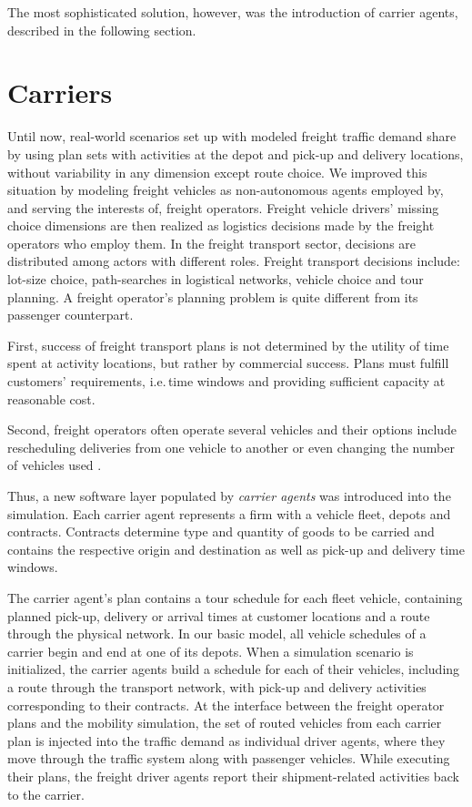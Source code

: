 The most sophisticated solution, however, was the introduction of carrier agents, described in the following section. 

\section{Carriers}
\label{sec:carriers}
Until now, real-world scenarios set up with  modeled freight traffic demand share by using plan sets with activities at the depot and pick-up and delivery locations, without variability in any dimension except route choice. We improved this situation by modeling freight vehicles as non-autonomous agents employed by, and serving the interests of, freight operators. Freight vehicle drivers' missing choice dimensions are then realized as logistics decisions made by the freight operators who employ them. In the freight transport sector, decisions are distributed among actors with different roles. Freight transport decisions include: lot-size choice, path-searches in logistical networks, vehicle choice and tour planning. A freight operator's planning problem is quite different from its passenger counterpart.

First, success of freight transport plans is not determined by the utility of time
spent at activity locations, but rather by commercial success. Plans must fulfill
customers' requirements, i.e.\,time windows and providing sufficient capacity at
reasonable cost.

Second, freight operators often operate several vehicles and their
options include rescheduling deliveries from one vehicle to another or even changing the
number of vehicles used .

Thus, a new software layer populated by \emph{carrier agents} was introduced into the
simulation. Each carrier agent represents a firm with a vehicle fleet, depots and contracts.
Contracts determine type and quantity of goods to be carried and contains the respective 
origin and destination as well as pick-up and delivery time windows.

The carrier agent's plan contains a tour schedule  for each fleet  vehicle, containing 
planned pick-up, delivery or arrival times at customer locations and a route through 
the physical network. In our basic model, all vehicle schedules of a carrier begin and end at one of its depots.
When a simulation scenario is initialized, the carrier agents build a schedule for each of their vehicles, 
including a route through the transport network, with pick-up and delivery activities corresponding to their contracts.
At the interface between the freight operator plans and the mobility simulation, the set of routed vehicles 
from each carrier plan is injected into the traffic demand as individual driver agents, where they move 
through the traffic system along with passenger vehicles. While executing their plans, the freight driver 
agents report their shipment-related activities back to the carrier.


